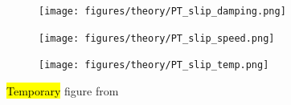\begin{figure}[H]
  \centering
  \begin{subfigure}[t]{0.32\textwidth}
      \centering
      \texttt{[image: figures/theory/PT\_slip\_damping.png]}
      \caption{}
  \end{subfigure}
  \hfill
  \begin{subfigure}[t]{0.32\textwidth}
      \centering
      \texttt{[image: figures/theory/PT\_slip\_speed.png]}
      \label{fig:PT_slip_vel}
      \caption{}
  \end{subfigure}
  \hfill
  \begin{subfigure}[t]{0.32\textwidth}
      \centering
      \texttt{[image: figures/theory/PT\_slip\_temp.png]}
      \caption{}
  \end{subfigure}
  \hfill
     \caption{\hl{Temporary} figure from \cite{Yalin_2011}}
     \label{fig:PT_slip_var}
\end{figure}














